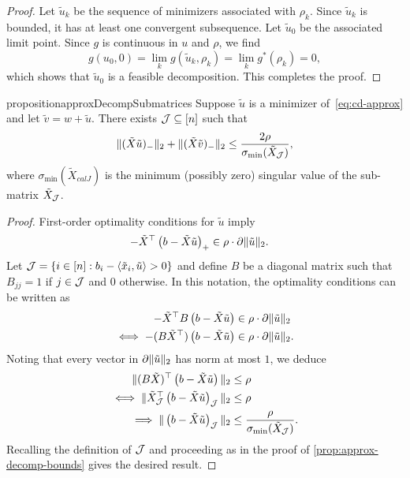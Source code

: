 \begin{proof}
	Let \( \tilde u_k \) be the sequence of minimizers associated with \( \rho_k \).
	Since \( \tilde u_k \) is bounded, it has at least one convergent subsequence.
	Let \( \tilde u_0 \) be the associated limit point.
	Since \( g \) is continuous in \( u \) and \( \rho \), we find
	\[ g(u_0, 0) = \lim_k g(\tilde u_k, \rho_k) = \lim_k g^*(\rho_k) = 0, \]
	which shows that \( \tilde u_0 \) is a feasible decomposition.
	This completes the proof.
\end{proof}

\begin{restatable}{proposition}{approxDecompSubmatrices}\label{prop:approx-decomp-submatrices}
    Suppose \( \tilde u \) is a minimizer of~\eqref{eq:cd-approx} and let 
    \( \tilde v = w + \tilde u \). 
    There exists \( \mathcal{J} \subseteq [n] \) such that
	\[
		\|(\tilde X \tilde u)_-\|_2 + \|(\tilde X \tilde v)_-\|_2
		\leq \frac{2\rho}{\sigma_{\text{min}}(\tilde X_{\mathcal{J}})},
	\]
	where \( \sigma_{\text{min}}(\tilde X_{calJ}) \) is the minimum
	(possibly zero) singular value of the sub-matrix \( \tilde X_{\mathcal{J}} \).
\end{restatable}
\begin{proof}
	First-order optimality conditions for \( \tilde u \) imply
	\begin{align*}
		-\tilde X^\top \left(b - \tilde X \tilde u\right)_+
		 & \in \rho \cdot \partial \|\tilde u\|_2.
	\end{align*}
	Let \( \mathcal{J} = \left\{i \in [n] : b_i - \left\langle\tilde x_i, \tilde u\right\rangle > 0 \right\} \)
	and define \( B \) be a diagonal matrix such that \( B_{jj} = 1 \) if
	\( j \in \mathcal{J} \) and \( 0 \) otherwise.
	In this notation, the optimality conditions can be written as
	\begin{align*}
		-\tilde X^\top B\left(b - \tilde X \tilde u\right)
		 & \in \rho \cdot \partial \|\tilde u\|_2  \\
		\iff
		-(B \tilde X^\top)\left(b - \tilde X \tilde u\right)
		 & \in \rho \cdot \partial \|\tilde u\|_2.
	\end{align*}
	Noting that every vector in \( \partial \|\tilde u\|_2 \) has norm at most
	\( 1 \), we deduce
	\begin{align*}
		\|(B \tilde X)^\top \left(b - \tilde X \tilde u\right)\|_2
		 & \leq \rho                                                \\
		\iff
		\|\tilde X_{\mathcal{J}}^\top \left(b - \tilde X \tilde u\right)_{\mathcal{J}}\|_2
		 & \leq \rho                                                \\
		\implies
		\|\left(b - \tilde X \tilde u\right)_{\mathcal{J}}\|_2
		 & \leq \frac{\rho}{\sigma_{\text{min}}(\tilde X_{\mathcal{J}})}.
	\end{align*}
	Recalling the definition of \( \mathcal{J} \) and proceeding as in the proof of
	\cref{prop:approx-decomp-bounds} gives the desired result.
\end{proof}

